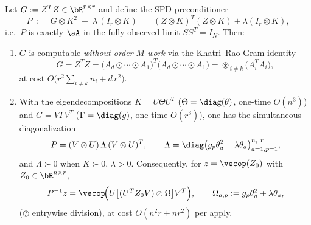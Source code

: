 \begin{lemma}\label{lem:precond}
Let $G:=Z^{T}Z\in\bR^{r\times r}$ and define the SPD preconditioner
\begin{equation}\label{eq:Pdef}
  P \;:=\; G\otimes K^{2}\;+\;\lambda\,(I_r\otimes K)
  \;=\;(Z\otimes K)^{T}(Z\otimes K)+\lambda(I_r\otimes K),
\end{equation}
i.e.\ $P$ is exactly $\aA$ in the fully observed limit $SS^{T}=I_N$. Then:
\begin{enumerate}[label=\textup{(\roman*)}]
\item $G$ is computable \emph{without order-$M$ work} via the Khatri--Rao
      Gram identity
      \begin{equation}\label{eq:krgram}
        G=Z^{T}Z=\big(A_{d}\odot\!\cdots\!\odot A_{1}\big)^{T}\!\big(A_{d}\odot\!\cdots\!\odot A_{1}\big)
        =\!\!\!\circledast_{\,i\neq k}\!\!\big(A_i^{T}A_i\big),
      \end{equation}
      at cost $O\!\big(r^{2}\sum_{i\neq k} n_i + d\,r^{2}\big)$.
\item With the eigendecompositions $K=U\Theta U^{T}$ ($\Theta=\diag(\theta)$,
      one-time $O(n^{3})$) and $G=V\Gamma V^{T}$ ($\Gamma=\diag(g)$, one-time
      $O(r^{3})$), one has the simultaneous diagonalization
      \begin{equation}\label{eq:Peig}
        P=(V\otimes U)\,\Lambda\,(V\otimes U)^{T},\qquad
        \Lambda=\diag\big(g_p\theta_a^{2}+\lambda\theta_a\big)_{a=1,p=1}^{n,\ r},
      \end{equation}
      and $\Lambda\succ0$ when $K\succ0$, $\lambda>0$. Consequently, for
      $z=\vecop(Z_0)$ with $Z_0\in\bR^{n\times r}$,
      \begin{equation}\label{eq:Pinv}
        P^{-1}z=\vecop\!\Big(U\big[(U^{T}Z_0V)\oslash \Omega\big]V^{T}\Big),
        \qquad \Omega_{a,p}:=g_p\theta_a^{2}+\lambda\theta_a,
      \end{equation}
      ($\oslash$ entrywise division), at cost $O(n^{2}r+nr^{2})$ per apply.
\end{enumerate}
\end{lemma}

